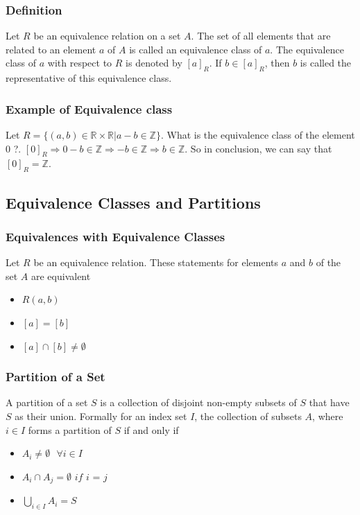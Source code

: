 \documentclass{article}
\begin{document}
\subsubsection{Definition} Let $ R $ be an equivalence relation on a set $ A $. The set of all elements that are related to an element $ a $ of $ A $ is called an equivalence class of $ a $. The equivalence class of $ a $ with respect to $ R $ is denoted by $ [a]_{R} $. If $ b \in [a]_R $, then $ b $ is called the representative of this equivalence class.

\subsubsection{Example of Equivalence class} Let $ R = \{(a,b) \in \mathbb{R} \times \mathbb{R} | a - b \in \mathbb{Z}\} $. What is the equivalence class of the element 0 ?. $ [0]_R \Rightarrow 0 - b \in \mathbb{Z} \Rightarrow -b \in \mathbb{Z} \Rightarrow b \in \mathbb{Z} $. So in conclusion, we can say that $ [0]_R = \mathbb{Z} $.

\subsection{Equivalence Classes and Partitions}
\subsubsection{Equivalences with Equivalence Classes}
\begin{tcolorbox}[sharp corners, colback=green!30, colframe=green!80!blue, title=Equivalences with equivalence classes]
Let $ R $ be an equivalence relation. These statements for elements $ a $ and $ b $ of the set $ A $ are equivalent
\begin{itemize}
\item $ R(a,b) $
\item $ [a] = [b] $
\item $ [a] \cap [b] \neq \emptyset $
\end{itemize}
\end{tcolorbox}

\subsubsection{Partition of a Set} A partition of a set $ S $ is a collection of disjoint non-empty subsets of $ S $ that have $ S $ as their union. Formally for an index set $ I $, the collection of subsets $ A $, where $ i \in I $ forms a partition of $ S $ if and only if
\begin{itemize}
\item $ A_i \neq \emptyset \textit{ } \forall i \in I $
\item $ A_i \cap A_j = \emptyset \textit{ if i = j } $
\item $ \bigcup\limits_{i \in I}A_i = S $
\end{itemize}
\end{document}
